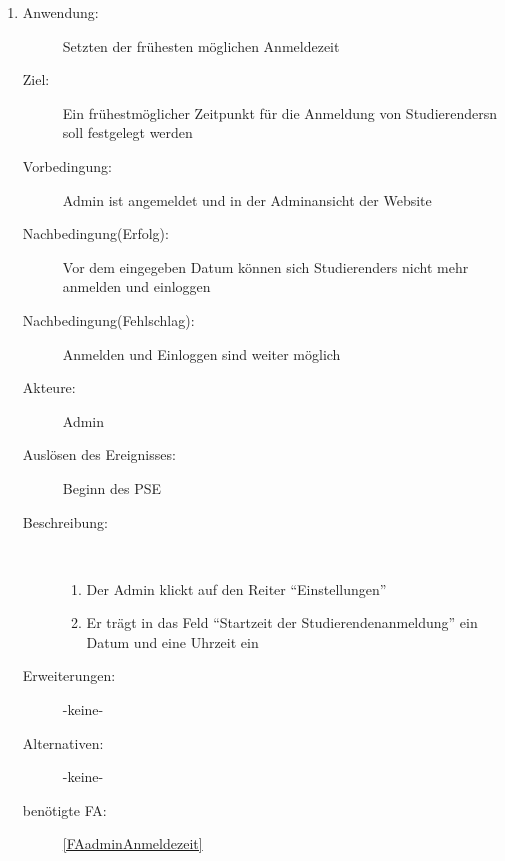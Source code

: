 \documentclass[parskip=full]{scrartcl}
\newcommand{\swtLabel}[1]{\textbf{/#1\arabic*0/}}
\begin{document}
\begin{enumerate} [label=\swtLabel{A}]
	\item \label{UCadminAnmeldezeit}
	\begin{description}
		\item[Anwendung:] Setzten der frühesten möglichen Anmeldezeit
		\item[Ziel:] Ein frühestmöglicher Zeitpunkt für die Anmeldung von \glspl{Studierender}n soll festgelegt werden
		\item[Vorbedingung:] \gls{Admin} ist angemeldet und in der Adminansicht der Website
		\item[Nachbedingung(Erfolg):] Vor dem eingegeben Datum können sich
		\glspl{Studierender} nicht mehr anmelden und einloggen
		\item[Nachbedingung(Fehlschlag):] Anmelden und Einloggen sind weiter möglich
		\item[Akteure:] \gls{Admin}
		\item[Auslösen des Ereignisses:] Beginn des \gls{PSE}
		\item[Beschreibung:]~
		\begin{enumerate}[label=\arabic*.]
			\item Der \gls{Admin} klickt auf den Reiter \enquote{Einstellungen}
			\item Er trägt in das Feld \enquote{Startzeit der Studierendenanmeldung} ein Datum und eine Uhrzeit ein
		\end{enumerate}
		\item[Erweiterungen:] -keine-
		\item[Alternativen:] -keine-
		\item[benötigte FA:] \ref{FAadminAnmeldezeit}
	\end{description}	
	

\end{enumerate}
\end{document}

